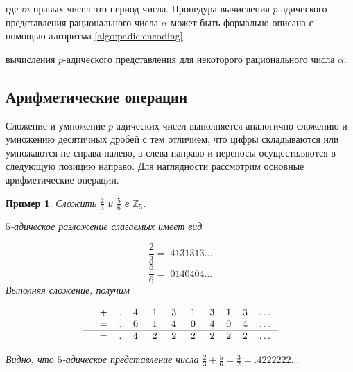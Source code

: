 \documentclass[master, och, diploma, times]{sty/SCWorks}
\theoremstyle{plain}
\newtheorem{exmp}{Пример}[section]
\theoremstyle{definition}
\numberwithin{equation}{section}
\begin{document}
\noindent где $m$ правых чисел это период числа. Процедура вычисления $p$-адического представления рационального числа $\alpha$ может быть формально описана с помощью алгоритма \ref{algo:padic:encoding}.

\begin{algorithm}
\DontPrintSemicolon %
\caption{вычисления $p$-адического представления для некоторого рационального числа $\alpha$.}
\label{algo:padic:encoding}
\end{algorithm}


\subsection{Арифметические операции}

Сложение и умножение $p$-адических чисел выполняется аналогично сложению и умножению десятичных дробей с тем отличием, что цифры складываются или умножаются не справа налево, а слева направо и переносы осуществляются в следующую позицию направо. Для наглядности рассмотрим основные арифметические операции.

\begin{exmp}
Сложить $\frac{2}{3}$ и $\frac{5}{6}$ в $\mathbb{Z}_5$.

\noindent $5$-адическое разложение слагаемых имеет вид

$$
\frac{2}{3}=.4131313\dots
$$
$$
\frac{5}{6}=.0140404\dots
$$
Выполняя сложение, получим

$$
\begin{tabular}{cccccccccccc}
& + & . & 4\; & 1\; & 3\; & 1\; & 3 & 1 & 3 & \dots \\
& = & . & 0\; & 1\; & 4\; & 0\; & 4 & 0 & 4 & \dots \\
\hline
& = & . & 4\; & 2\; & 2\; & 2\; & 2 & 2 & 2 & \dots
\end{tabular}
$$

\noindent Видно, что $5$-адическое представление числа $\frac{2}{3} + \frac{5}{6}=\frac{3}{2}=.4222222\dots$
\end{exmp}
\end{document}
